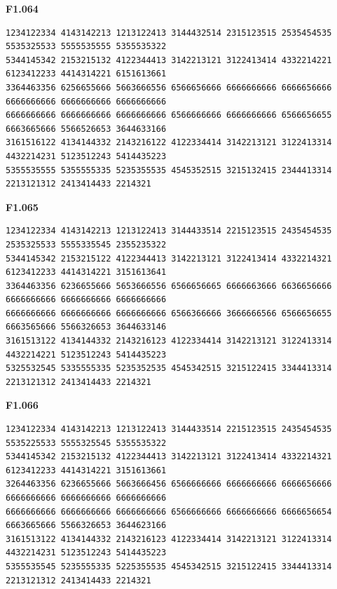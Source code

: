 \noindent\begin{minipage}{\linewidth}\textbf{F1.064}
\begin{lstlisting}
1234122334 4143142213 1213122413 3144432514 2315123515 2535454535 5535325533 5555535555 5355535322
5344145342 2153215132 4122344413 3142213121 3122413414 4332214221 6123412233 4414314221 6151613661
3364463356 6256655666 5663666556 6566656666 6666666666 6666656666 6666666666 6666666666 6666666666
6666666666 6666666666 6666666666 6566666666 6666666666 6566656655 6663665666 5566526653 3644633166
3161516122 4134144332 2143216122 4122334414 3142213121 3122413314 4432214231 5123512243 5414435223
5355535555 5355555335 5235355535 4545352515 3215132415 2344413314 2213121312 2413414433 2214321
\end{lstlisting}
\end{minipage}\par\smallskip

\noindent\begin{minipage}{\linewidth}\textbf{F1.065}
\begin{lstlisting}
1234122334 4143142213 1213122413 3144433514 2215123515 2435454535 2535325533 5555335545 2355235322
5344145342 2153215122 4122344413 3142213121 3122413414 4332214321 6123412233 4414314221 3151613641
3364463356 6236655666 5653666556 6566656665 6666663666 6636656666 6666666666 6666666666 6666666666
6666666666 6666666666 6666666666 6566366666 3666666566 6566656655 6663565666 5566326653 3644633146
3161513122 4134144332 2143216123 4122334414 3142213121 3122413314 4432214221 5123512243 5414435223
5325532545 5335555335 5235352535 4545342515 3215122415 3344413314 2213121312 2413414433 2214321
\end{lstlisting}
\end{minipage}\par\smallskip

\noindent\begin{minipage}{\linewidth}\textbf{F1.066}
\begin{lstlisting}
1234122334 4143142213 1213122413 3144433514 2215123515 2435454535 5535225533 5555325545 5355535322
5344145342 2153215132 4122344413 3142213121 3122413414 4332214321 6123412233 4414314221 3151613661
3264463356 6236655666 5663666456 6566666666 6666666666 6666656666 6666666666 6666666666 6666666666
6666666666 6666666666 6666666666 6566666666 6666666666 6666656654 6663665666 5566326653 3644623166
3161513122 4134144332 2143216123 4122334414 3142213121 3122413314 4432214231 5123512243 5414435223
5355535545 5235555335 5225355535 4545342515 3215122415 3344413314 2213121312 2413414433 2214321
\end{lstlisting}
\end{minipage}\par\smallskip

